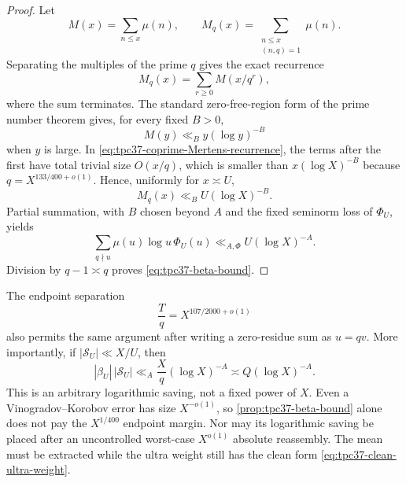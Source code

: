 \begin{proof}
Let
\begin{equation}
 M(x)=\sum_{n\le x}\mu(n),
 \qquad
 M_q(x)=\sum_{\substack{n\le x\\(n,q)=1}}\mu(n).
 \label{eq:tpc37-Mertens-functions}
\end{equation}
Separating the multiples of the prime \(q\) gives the exact recurrence
\begin{equation}
 M_q(x)=\sum_{r\ge0}M(x/q^r),
 \label{eq:tpc37-coprime-Mertens-recurrence}
\end{equation}
where the sum terminates.  The standard zero-free-region form of the
prime number theorem \citep[Chapters~5 and~18]{IwaniecKowalski2004}
gives, for every fixed \(B>0\),
\begin{equation}
 M(y)\ll_B y(\log y)^{-B}
 \label{eq:tpc37-standard-Mertens-bound}
\end{equation}
when \(y\) is large.  In
\eqref{eq:tpc37-coprime-Mertens-recurrence}, the terms after the first
have total trivial size \(O(x/q)\), which is smaller than
\(x(\log X)^{-B}\) because \(q=X^{133/400+o(1)}\).  Hence, uniformly for
\(x\asymp U\),
\begin{equation}
 M_q(x)\ll_B U(\log X)^{-B}.
 \label{eq:tpc37-uniform-coprime-Mertens}
\end{equation}
Partial summation, with \(B\) chosen beyond \(A\) and the fixed seminorm
loss of \(\Phi_U\), yields
\begin{equation}
 \sum_{q\nmid u}\mu(u)\log u\,\Phi_U(u)
 \ll_{A,\Phi}U(\log X)^{-A}.
 \label{eq:tpc37-weighted-one-Mobius}
\end{equation}
Division by \(q-1\asymp q\) proves
\eqref{eq:tpc37-beta-bound}.
\end{proof}

The endpoint separation
\begin{equation}
 \frac Tq=X^{107/2000+o(1)}
 \label{eq:tpc37-ultra-quotient-length}
\end{equation}
also permits the same argument after writing a zero-residue sum as
\(u=qv\).  More importantly, if \(|\mathcal S_U|\ll X/U\), then
\begin{equation}
 |\beta_U|\,|\mathcal S_U|
 \ll_A\frac Xq(\log X)^{-A}
 \asymp Q(\log X)^{-A}.
 \label{eq:tpc37-beta-times-s-length}
\end{equation}
This is an arbitrary logarithmic saving, not a fixed power of \(X\).
Even a Vinogradov--Korobov error has size \(X^{-o(1)}\), so
\cref{prop:tpc37-beta-bound} alone does not pay the
\(X^{1/400}\) endpoint margin.  Nor may its logarithmic saving be placed
after an uncontrolled worst-case \(X^{o(1)}\) absolute reassembly.  The
mean must be extracted while the ultra weight still has the clean form
\eqref{eq:tpc37-clean-ultra-weight}.

